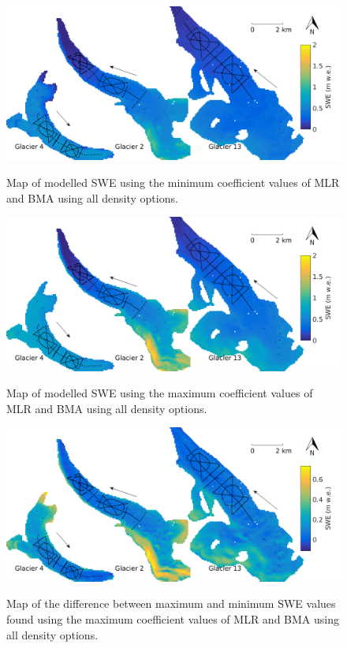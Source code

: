 \documentclass[12pt]{article}
\begin{document}
	\begin{figure}[H]
	\centering
	\includegraphics[width =\textwidth]{SWEminModelled.png}\\
	\caption{Map of modelled SWE using the minimum coefficient values of MLR and BMA using all density options.}
	\label{fig:SWEminModelled}
\end{figure}
	
	\begin{figure}[H]
	\centering
	\includegraphics[width =\textwidth]{SWEmaxModelled.png}\\
	\caption{Map of modelled SWE using the maximum coefficient values of MLR and BMA using all density options.}
	\label{fig:SWEmaxModelled}
\end{figure}
	
\begin{figure}[H]
	\centering
	\includegraphics[width =\textwidth]{SWErangeModelled.png}\\
	\caption{Map of the difference between maximum and minimum SWE values found using the maximum coefficient values of MLR and BMA using all density options.}
	\label{fig:SWErangeModelled}
\end{figure}
	
\end{document}
